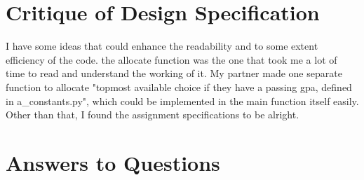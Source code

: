 \documentclass[12pt]{article}
\begin{document}
\section{Critique of Design Specification}
I have some ideas that could enhance the readability and to some extent efficiency of the code. the allocate function was the one that took me a lot of time to read and understand the working of it. My partner made one separate function to allocate "topmost available choice if they have a passing gpa, defined in a\_constants.py", which could be implemented in the main function itself easily. Other than that, I found the assignment specifications to be alright.


\section{Answers to Questions}
\end{document}
